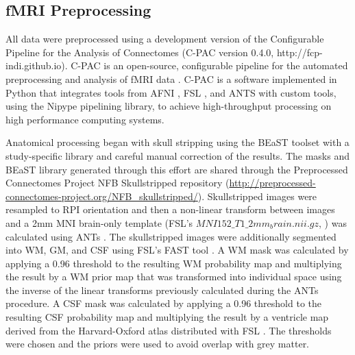 \subsection{fMRI Preprocessing}

All data were preprocessed using a development version of the Configurable Pipeline for the Analysis of Connectomes (C-PAC version 0.4.0, http://fcp-indi.github.io). C-PAC is an open-source, configurable pipeline for the automated preprocessing and analysis of fMRI data \cite{Cameron2013}. C-PAC is a software implemented in Python that integrates tools from AFNI \cite{Cox1996}, FSL \cite{Smith2004}, and ANTS \cite{Avants2008} with custom tools, using the Nipype \cite{Gorgolewski2011} pipelining library, to achieve high-throughput processing on high performance computing systems.

Anatomical processing began with skull stripping using the BEaST toolset \cite{Eskildsen2012} with a study-specific library and careful manual correction of the results. The masks and BEaST library generated through this effort are shared through the Preprocessed Connectomes Project NFB Skullstripped repository (\href{http://preprocessed-connectomes-project.org/NFB_skullstripped/}{http://preprocessed-connectomes-project.org/NFB\_skullstripped/})\cite{Puccio2016}. Skullstripped images were resampled to RPI orientation and then a non-linear transform between images and a 2mm MNI brain-only template (FSL's $MNI152\_T1\_2mm_brain.nii.gz$, \cite{Smith_2004}) was calculated using ANTs \cite{Avants_2008}. The skullstripped images were additionally segmented into WM, GM, and CSF using FSL's FAST tool \cite{Zhang_2001}. A WM mask was calculated by applying a 0.96 threshold to the resulting WM probability map and multiplying the result by a WM prior map that was transformed into individual space using the inverse of the linear transforms previously calculated during the ANTs procedure. A CSF mask was calculated by applying a 0.96 threshold to the resulting CSF probability map and multiplying the result by a ventricle map derived from the Harvard-Oxford atlas distributed with FSL \cite{Makris_2006}. The thresholds were chosen and the priors were used to avoid overlap with grey matter.

